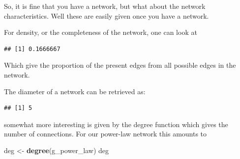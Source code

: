 \documentclass[]{article}
\newenvironment{Shaded}{\begin{snugshade}}{\end{snugshade}}
\newcommand{\KeywordTok}[1]{\textcolor[rgb]{0.13,0.29,0.53}{\textbf{{#1}}}}
\newcommand{\StringTok}[1]{\textcolor[rgb]{0.31,0.60,0.02}{{#1}}}
\newcommand{\NormalTok}[1]{{#1}}
\begin{document}
So, it is fine that you have a network, but what about the network
characteristics. Well these are easily given once you have a network.

For density, or the completeness of the network, one can look at

\begin{Shaded}
\end{Shaded}

\begin{verbatim}
## [1] 0.1666667
\end{verbatim}

Which give the proportion of the present edges from all possible edges
in the network.

The diameter of a network can be retrieved as:

\begin{Shaded}
\end{Shaded}

\begin{verbatim}
## [1] 5
\end{verbatim}

somewhat more interesting is given by the degree function which gives
the number of connections. For our power-law network this amounts to

\begin{Shaded}
\begin{Highlighting}[]
\NormalTok{deg <-}\StringTok{ }\KeywordTok{degree}\NormalTok{(g_power_law)}
\NormalTok{deg}
\end{Highlighting}
\end{Shaded}
\end{document}
